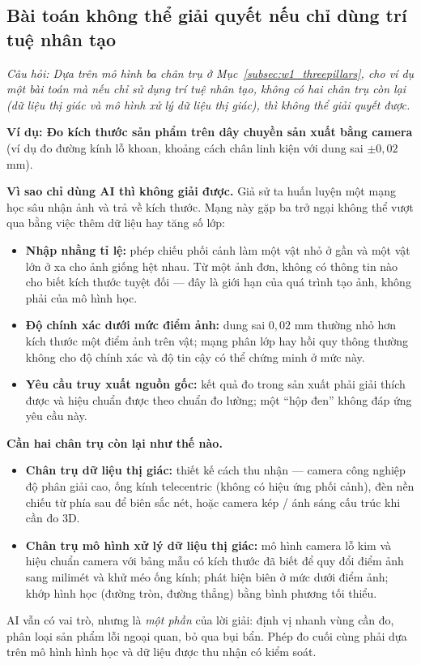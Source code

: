 \subsection{Bài toán không thể giải quyết nếu chỉ dùng trí tuệ nhân tạo}
\label{subsec:w1_twopillars}

\textit{Câu hỏi: Dựa trên mô hình ba chân trụ ở Mục~\ref{subsec:w1_threepillars}, cho ví dụ một bài toán mà nếu chỉ sử dụng trí tuệ nhân tạo, không có hai chân trụ còn lại (dữ liệu thị giác và mô hình xử lý dữ liệu thị giác), thì không thể giải quyết được.}

\textbf{Ví dụ: Đo kích thước sản phẩm trên dây chuyền sản xuất bằng camera} (ví dụ đo đường kính lỗ khoan, khoảng cách chân linh kiện với dung sai $\pm 0{,}02$ mm).

\textbf{Vì sao chỉ dùng AI thì không giải được.} Giả sử ta huấn luyện một mạng học sâu nhận ảnh và trả về kích thước. Mạng này gặp ba trở ngại không thể vượt qua bằng việc thêm dữ liệu hay tăng số lớp:
\begin{itemize}
    \item \textbf{Nhập nhằng tỉ lệ:} phép chiếu phối cảnh làm một vật nhỏ ở gần và một vật lớn ở xa cho ảnh giống hệt nhau. Từ một ảnh đơn, không có thông tin nào cho biết kích thước tuyệt đối — đây là giới hạn của quá trình tạo ảnh, không phải của mô hình học.
    \item \textbf{Độ chính xác dưới mức điểm ảnh:} dung sai $0{,}02$ mm thường nhỏ hơn kích thước một điểm ảnh trên vật; mạng phân lớp hay hồi quy thông thường không cho độ chính xác và độ tin cậy có thể chứng minh ở mức này.
    \item \textbf{Yêu cầu truy xuất nguồn gốc:} kết quả đo trong sản xuất phải giải thích được và hiệu chuẩn được theo chuẩn đo lường; một ``hộp đen'' không đáp ứng yêu cầu này.
\end{itemize}

\textbf{Cần hai chân trụ còn lại như thế nào.}
\begin{itemize}
    \item \textbf{Chân trụ dữ liệu thị giác:} thiết kế cách thu nhận — camera công nghiệp độ phân giải cao, ống kính telecentric (không có hiệu ứng phối cảnh), đèn nền chiếu từ phía sau để biên sắc nét, hoặc camera kép / ánh sáng cấu trúc khi cần đo 3D.
    \item \textbf{Chân trụ mô hình xử lý dữ liệu thị giác:} mô hình camera lỗ kim và hiệu chuẩn camera với bảng mẫu có kích thước đã biết để quy đổi điểm ảnh sang milimét và khử méo ống kính; phát hiện biên ở mức dưới điểm ảnh; khớp hình học (đường tròn, đường thẳng) bằng bình phương tối thiểu.
\end{itemize}
AI vẫn có vai trò, nhưng là \emph{một phần} của lời giải: định vị nhanh vùng cần đo, phân loại sản phẩm lỗi ngoại quan, bỏ qua bụi bẩn. Phép đo cuối cùng phải dựa trên mô hình hình học và dữ liệu được thu nhận có kiểm soát.


